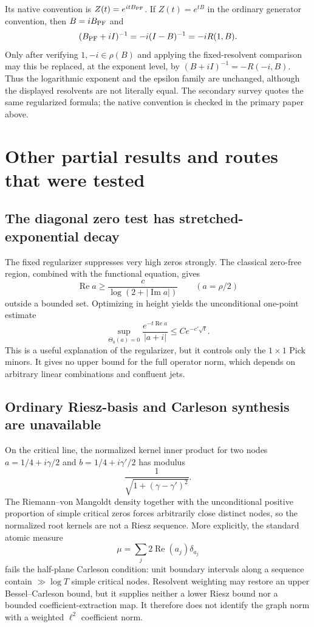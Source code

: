 \documentclass[11pt]{amsart}
\theoremstyle{definition}
\theoremstyle{remark}
\DeclareMathOperator{\Repart}{Re}
\DeclareMathOperator{\Impart}{Im}
\newcommand{\abs}[1]{\left\lvert #1\right\rvert}
\begin{document}
Its native convention is $Z(t)=e^{itB_{\rm PF}}$.  If $Z(t)=e^{tB}$ in the
ordinary generator convention, then $B=iB_{\rm PF}$ and
\begin{equation}\label{eq:PF-regularizer-conversion}
 (B_{\rm PF}+iI)^{-1}=-i(I-B)^{-1}=-iR(1,B).
\end{equation}
Only after verifying $1,-i\in\rho(B)$ and applying the fixed-resolvent
comparison may this be replaced, at the exponent level, by
$(B+iI)^{-1}=-R(-i,B)$.  Thus the logarithmic exponent and the epsilon family
are unchanged, although the displayed resolvents are not literally equal.
The secondary survey \cite[\S3.2, (3.6), p.~1004]{TakhtajanEtAl2017} quotes
the same regularized formula; the native convention is checked in the primary
paper above.

\section{Other partial results and routes that were tested}
\label{sec:other-routes}

\subsection{The diagonal zero test has stretched-exponential decay}

The fixed regularizer suppresses very high zeros strongly.  The classical
zero-free region, combined with the functional equation, gives
\[
 \Repart a\geq\frac{c}{\log(2+\abs{\Impart a})}
 \qquad(a=\rho/2)
\]
outside a bounded set.  Optimizing in height yields the unconditional
one-point estimate
\begin{equation}\label{eq:diagonal-stretched}
 \sup_{\Theta_0(a)=0}
 \frac{e^{-t\Repart a}}{\abs{a+i}}
 \leq C e^{-c'\sqrt t}.
\end{equation}
This is a useful explanation of the regularizer, but it controls only the
$1\times1$ Pick minors.  It gives no upper bound for the full operator norm,
which depends on arbitrary linear combinations and confluent jets.

\subsection{Ordinary Riesz-basis and Carleson synthesis are unavailable}

On the critical line, the normalized kernel inner product for two nodes
$a=1/4+i\gamma/2$ and $b=1/4+i\gamma'/2$ has modulus
\[
 \frac1{\sqrt{1+(\gamma-\gamma')^2}}.
\]
The Riemann--von Mangoldt density together with the unconditional positive
proportion of simple critical zeros forces arbitrarily close distinct nodes,
so the normalized root kernels are not a Riesz sequence.  More explicitly,
the standard atomic measure
\[
 \mu=\sum_j2\Repart(a_j)\delta_{a_j}
\]
fails the half-plane Carleson condition: unit boundary intervals along a
sequence contain $\gg\log T$ simple critical nodes.  Resolvent weighting may
restore an upper Bessel--Carleson bound, but it supplies neither a lower Riesz
bound nor a bounded coefficient-extraction map.  It therefore does not
identify the graph norm with a weighted $\ell^2$ coefficient norm.
\end{document}
